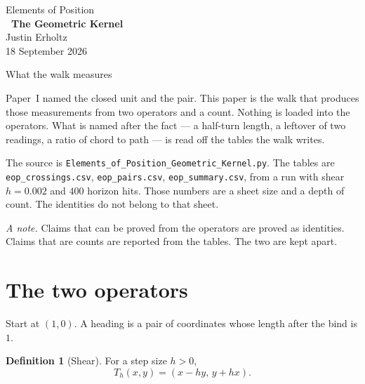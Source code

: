 \documentclass[10pt,a4paper]{article}
\theoremstyle{plain}
\theoremstyle{definition}
\newtheorem{definition}{Definition}
\theoremstyle{remark}
\begin{document}
\begin{center}
\vspace*{2.2em}
{\large Elements of Position}\\[1.6em]
{\LARGE\bfseries\ The Geometric Kernel}\\[2.2em]
{\normalsize Justin Erholtz}\\[0.35em]
{\small 18 September 2026}
\end{center}

\vspace{2.4em}

\begin{center}
{\large What the walk measures}
\end{center}

\vspace{1.8em}

\noindent
Paper~I named the closed unit and the pair.
This paper is the walk that produces those measurements from two operators and a count.
Nothing is loaded into the operators.
What is named after the fact --- a half-turn length, a leftover of two readings, a ratio of chord to path --- is read off the tables the walk writes.

The source is \texttt{Elements\_of\_Position\_Geometric\_Kernel.py}.
The tables are \texttt{eop\_crossings.csv}, \texttt{eop\_pairs.csv}, \texttt{eop\_summary.csv}, from a run with shear \(h=0.002\) and \(400\) horizon hits.
Those numbers are a sheet size and a depth of count.
The identities do not belong to that sheet.

\vspace{1.4em}

\noindent
\textit{A note.}
Claims that can be proved from the operators are proved as identities.
Claims that are counts are reported from the tables.
The two are kept apart.

\newpage
\tableofcontents
\newpage

\section{The two operators}

Start at \((1,0)\).
A heading is a pair of coordinates whose length after the bind is \(1\).

\begin{definition}[Shear]
For a step size \(h>0\),
\[
T_h(x,y)=(x-hy,\,y+hx).
\]
\end{definition}
\end{document}
